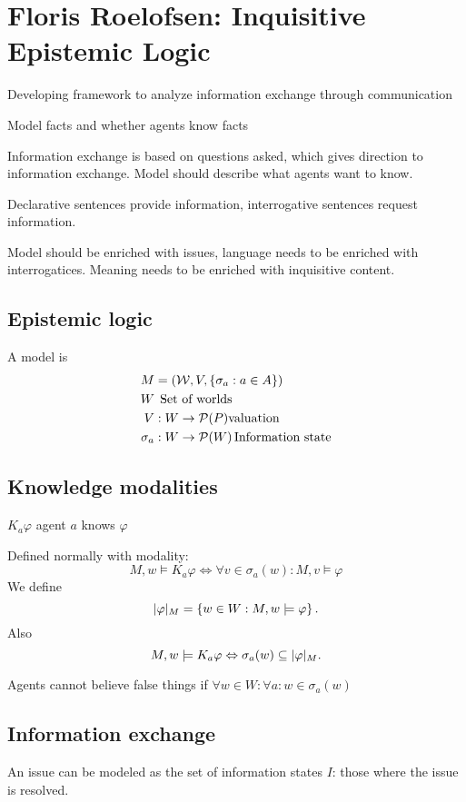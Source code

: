 \section{Floris Roelofsen: Inquisitive Epistemic Logic}

Developing framework to analyze information exchange through communication

Model facts and whether agents know facts

Information exchange is based on questions asked, which gives direction to
information exchange. Model should describe what agents want to know.

Declarative sentences provide information, interrogative sentences request
information.

Model should be enriched with issues, language needs to be enriched with
interrogatices. Meaning needs to be enriched with inquisitive content.

\subsection{Epistemic logic}
A model is
\begin{align*}
    M          & =(\mathcal{W},V,\left\{\sigma_{a}:a\in A\right\})  \\
    W          & \>\>\text{Set of worlds}                       \\
    V          & :W\to\mathcal{P}(P) \text{valuation}           \\
    \sigma_{a} & :W\to \mathcal{P}(W)\,\text{Information state}
\end{align*}

\subsection{Knowledge modalities}
\(K_{a}\varphi\) agent \(a\) knows \(\varphi\)

Defined normally with modality:
\[
    M,w\models K_{a}\varphi\Leftrightarrow\forall v\in\sigma_{a}(w):M,v\models\varphi
\]
We define
\[
    \lvert\varphi\rvert_{M}=\left\{w\in W:M,w\models\varphi\right\}.
\]
Also
\[
    M,w\models K_{a}\varphi\Leftrightarrow \sigma_{a}(w)\subseteq\lvert\varphi\rvert_{M}.
\]

Agents cannot believe false things if \(\forall w\in W:\forall a:
w\in\sigma_{a}(w)\)

\subsection{Information exchange}
An issue can be modeled as the set of information states \(I\): those where the issue
is resolved.

